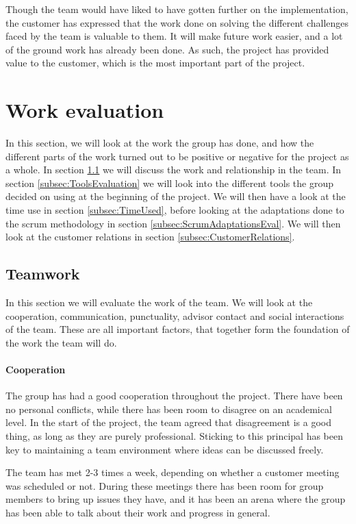 \documentclass[11pt,a4paper,titlepage,oneside]{report}
\begin{document}
Though the team would have liked to have gotten further on the implementation, the customer has expressed that the work done on solving the different challenges faced by the team is valuable to them. It will make future work easier, and a lot of the ground work has already been done. As such, the project has provided value to the customer, which is the most important part of the project.

\newpage
\section{Work evaluation}
In this section, we will look at the work the group has done, and how the different parts of the work turned out to be positive or negative for the project as a whole. In section \ref{subsec:Teamwork} we will discuss the work and relationship in the team. In section \ref{subsec:ToolsEvaluation} we will look into the different tools the group decided on using at the beginning of the project. We will then have a look at the time use in section \ref{subsec:TimeUsed}, before looking at the adaptations done to the scrum methodology in section \ref{subsec:ScrumAdaptationsEval}. We will then look at the customer relations in section \ref{subsec:CustomerRelations}.

\subsection{Teamwork}
\label{subsec:Teamwork}
In this section we will evaluate the work of the team. We will look at the cooperation, communication, punctuality, advisor contact and social interactions of the team. These are all important factors, that together form the foundation of the work the team will do.

\paragraph{Cooperation}
The group has had a good cooperation throughout the project. There have been no personal conflicts, while there has been room to disagree on an academical level. In the start of the project, the team agreed that disagreement is a good thing, as long as they are purely professional. Sticking to this principal has been key to maintaining a team environment where ideas can be discussed freely. 

The team has met 2-3 times a week, depending on whether a customer meeting was scheduled or not. During these meetings there has been room for group members to bring up issues they have, and it has been an arena where the group has been able to talk about their work and progress in general. 
\end{document}
